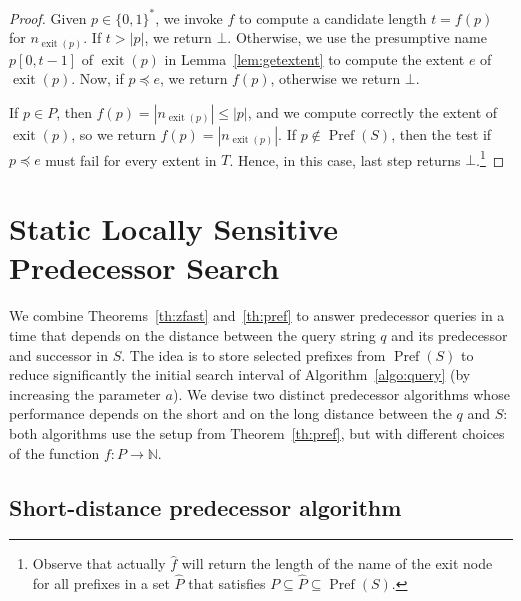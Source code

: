 \documentclass[a4paper,11pt]{article}
\newcommand{\N}{\mathbb{N}}
\newcommand{\?}{\mskip1.5mu}
\DeclareMathOperator{\exit}{exit}
\DeclareMathOperator{\Pref}{Pref}
\begin{document}
\begin{proof}
Given $p \in \{0, 1\}^*$, we invoke
$f$ to compute a candidate length $t = f(p)$ 
for $n_{\exit(p)}$.
If $t > |p|$, we return $\bot$.
Otherwise,  we use the presumptive
name $p[0, t - 1]$ of $\exit(p)$ 
in Lemma~\ref{lem:getextent} to compute 
the extent $e$ of $\exit(p)$. Now, 
if $p  \preceq e$, we return $f(p)$, otherwise we return $\bot$.

If $p\in P$, then $f(p) = |n_{\exit(p)}| \leq |p|$, and we
compute correctly the extent of $\exit(p)$, so we return 
$f(p)=|n_{\exit(p)}|$.
If $p \not\in \Pref(S)$, then the test if 
$p \preceq e$ must fail for every extent in $T$. 
Hence, in this case, last step returns $\bot$.\footnote{Observe 
that actually $\widehat f$ will return the length 
of the name of the exit node for all prefixes in a set $\hat P$ that 
satisfies $P\subseteq \hat P\subseteq\Pref(S)$.}
\end{proof}

\section{Static Locally Sensitive Predecessor Search}
\label{sec:pred}

We combine Theorems~\ref{th:zfast} and~\ref{th:pref} 
to answer predecessor queries in a time that depends 
on the distance between the query string $q$ and its 
predecessor and successor in $S$. The idea 
is to store selected prefixes from $\Pref(S)$
to reduce significantly the initial search interval of
Algorithm~\ref{algo:query} (by increasing the parameter $a$).
We devise two distinct predecessor algorithms whose 
performance depends on the short and on the
long distance between the $q$ and $S$:
both algorithms use the setup from Theorem~\ref{th:pref}, but with 
different choices of the function $f:P\to \N$. 

\subsection{Short-distance predecessor algorithm}
\end{document}
